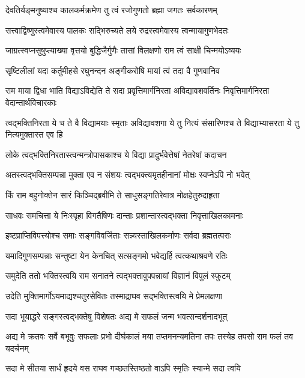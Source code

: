 \twolineshloka
{देवतिर्यङ्मनुष्याश्च कालकर्मक्रमेण तु}
{त्वं रजोगुणतो ब्रह्मा जगतः सर्वकारणम्} %

\twolineshloka
{सत्त्वाद्विष्णुस्त्वमेवास्य पालकः सद्भिरुच्यते}
{लये रुद्रस्त्वमेवास्य त्वन्मायागुणभेदतः} %

\twolineshloka
{जाग्रत्स्वप्नसुषुप्त्याख्या वृत्तयो बुद्धिजैर्गुणैः}
{तासां विलक्षणो राम त्वं साक्षी चिन्मयोऽव्ययः} %

\twolineshloka
{सृष्टिलीलां यदा कर्तुमीहसे रघुनन्दन}
{अङ्गीकरोषि मायां त्वं तदा वै गुणवानिव} %

\threelineshloka
{राम माया द्विधा भाति विद्याऽविद्येति ते सदा}
{प्रवृत्तिमार्गनिरता अविद्यावशवर्तिनः}
{निवृत्तिमार्गनिरता वेदान्तार्थविचारकाः} %

\threelineshloka
{त्वद्भक्तिनिरता ये च ते वै विद्यामयाः स्मृताः}
{अविद्यावशगा ये तु नित्यं संसारिणश्च ते}
{विद्याभ्यासरता ये तु नित्यमुक्तास्त एव हि} %

\twolineshloka
{लोके त्वद्भक्तिनिरतास्त्वन्मन्त्रोपासकाश्च ये}
{विद्या प्रादुर्भवेत्तेषां नेतरेषां कदाचन} %

\twolineshloka
{अतस्त्वद्भक्तिसम्पन्ना मुक्ता एव न संशयः}
{त्वद्भक्त्यमृतहीनानां मोक्षः स्वप्नेऽपि नो भवेत्} %

\twolineshloka
{किं राम बहुनोक्तेन सारं किञ्चिद्ब्रवीमि ते}
{साधुसङ्गतिरेवात्र मोक्षहेतुरुदाहृता} %

\twolineshloka
{साधवः समचित्ता ये निःस्पृहा विगतैषिणः}
{दान्ताः प्रशान्तास्त्वद्भक्ता निवृत्ताखिलकामनाः} %

\twolineshloka
{इष्टप्राप्तिविपत्त्योश्च समाः सङ्गविवर्जिताः}
{सन्न्यस्ताखिलकर्माणः सर्वदा ब्रह्मतत्पराः} %

\twolineshloka
{यमादिगुणसम्पन्नाः सन्तुष्टा येन केनचित्}
{सत्सङ्गमो भवेद्यर्हि त्वत्कथाश्रवणे रतिः} %

\twolineshloka
{समुदेति ततो भक्तिस्त्वयि राम सनातने}
{त्वद्भक्तावुपपन्नायां विज्ञानं विपुलं स्फुटम्} %

\twolineshloka
{उदेति मुक्तिमार्गोऽयमाद्यश्चतुरसेवितः}
{तस्माद्राघव सद्भक्तिस्त्वयि मे प्रेमलक्षणा} %

\twolineshloka
{सदा भूयाद्धरे सङ्गस्त्वद्भक्तेषु विशेषतः}
{अद्य मे सफलं जन्म भवत्सन्दर्शनादभूत्} %

\threelineshloka
{अद्य मे क्रतवः सर्वे बभूवुः सफलाः प्रभो}
{दीर्घकालं मया तप्तमनन्यमतिना तपः}
{तस्येह तपसो राम फलं तव यदर्चनम्} %

\twolineshloka
{सदा मे सीतया सार्धं हृदये वस राघव}
{गच्छतस्तिष्ठतो वाऽपि स्मृतिः स्यान्मे सदा त्वयि} %

